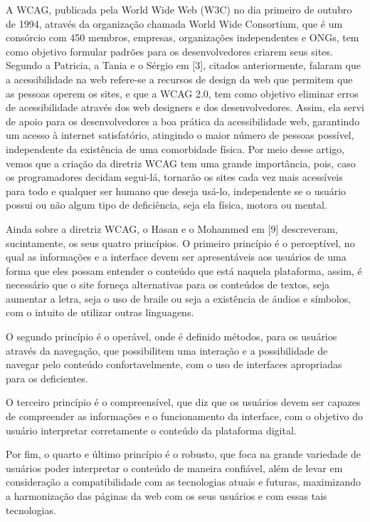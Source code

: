 \documentclass[a4paper]{article}
\begin{document}
\begin{titlepage}
A WCAG, publicada pela World Wide Web (W3C) no dia primeiro de outubro de 1994, através da organização chamada World Wide Consortium, que é um consórcio com 450 membros, empresas, organizações independentes e ONGs, tem como objetivo formular padrões para os desenvolvedores criarem seus sites. Segundo a Patricia, a Tania e o Sérgio em [3], citados anteriormente, falaram que a acessibilidade na web refere-se a recursos de design da web que permitem que as pessoas operem os sites, e que a WCAG 2.0, tem como objetivo eliminar erros de acessibilidade através dos web designers e dos desenvolvedores. Assim, ela servi de apoio para os desenvolvedores a boa prática da acessibilidade web, garantindo um acesso à internet satisfatório, atingindo o maior número de pessoas possível, independente da existência de uma comorbidade física. Por meio desse artigo, vemos que a criação da diretriz WCAG tem uma grande importância, pois, caso os programadores decidam segui-lá, tornarão os sites cada vez mais acessíveis para todo e qualquer ser humano que deseja usá-lo, independente se o usuário possui ou não algum tipo de deficiência, seja ela física, motora ou mental. 

Ainda sobre a diretriz WCAG, o Hasan e o Mohammed em [9] descreveram, sucintamente, os seus quatro princípios. O primeiro princípio é o perceptível, no qual as informações e a interface devem ser apresentáveis aos usuários de uma forma que eles possam entender o conteúdo que está naquela plataforma, assim, é necessário que o site forneça alternativas para os conteúdos de textos, seja aumentar a letra, seja o uso de braile ou seja a existência de áudios e símbolos, com o intuito de utilizar outras linguagens.

O segundo princípio é o operável, onde é definido métodos, para os usuários através da navegação, que possibilitem uma interação e a possibilidade de navegar pelo conteúdo confortavelmente, com o uso de interfaces apropriadas para os deficientes.

O terceiro princípio é o compreensível, que diz que os usuários devem ser capazes de compreender as informações e o funcionamento da interface, com o objetivo do usuário interpretar corretamente o conteúdo da plataforma digital.

Por fim, o quarto e último princípio é o robusto, que foca na grande variedade de usuários poder interpretar o conteúdo de maneira confiável, além de levar em consideração a compatibilidade com as tecnologias atuais e futuras, maximizando a harmonização das páginas da web com os seus usuários e com essas tais tecnologias.


\end{titlepage}
\end{document}
